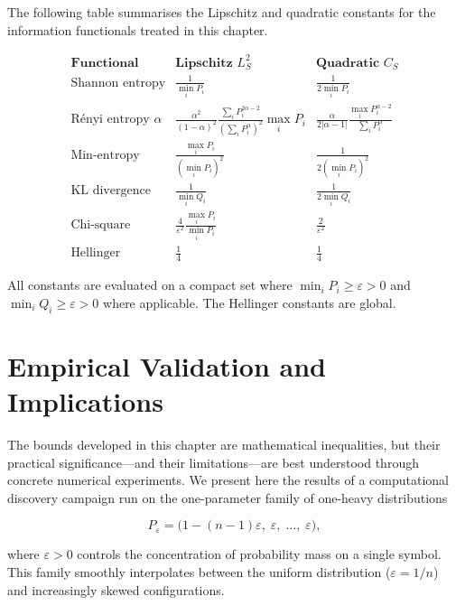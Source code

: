 The following table summarises the Lipschitz and quadratic constants
for the information functionals treated in this chapter.

\[
\begin{array}{lll}
\textbf{Functional} & \textbf{Lipschitz } L_S^2 & \textbf{Quadratic } C_S \\ \hline
\text{Shannon entropy} & \displaystyle\frac{1}{\min_i P_i} & \displaystyle\frac{1}{2\min_i P_i} \\[8pt]
\text{R\'enyi entropy } \alpha & \displaystyle\frac{\alpha^2}{(1-\alpha)^2}\frac{\sum_i P_i^{2\alpha-2}}{(\sum_i P_i^{\alpha})^2}\max_i P_i & \displaystyle\frac{\alpha}{2|\alpha-1|}\frac{\max_i P_i^{\alpha-2}}{\sum_i P_i^{\alpha}} \\[8pt]
\text{Min-entropy} & \displaystyle\frac{\max_i P_i}{(\min_i P_i)^2} & \displaystyle\frac{1}{2(\min_i P_i)^2} \\[8pt]
\text{KL divergence} & \displaystyle\frac{1}{\min_i Q_i} & \displaystyle\frac{1}{2\min_i Q_i} \\[8pt]
\text{Chi-square} & \displaystyle\frac{4}{\varepsilon^2}\frac{\max_i P_i}{\min_i P_i} & \displaystyle\frac{2}{\varepsilon^2} \\[8pt]
\text{Hellinger} & \displaystyle\frac14 & \displaystyle\frac14
\end{array}
\]

All constants are evaluated on a compact set where
\(\min_i P_i\ge\varepsilon>0\) and \(\min_i Q_i\ge\varepsilon>0\) where
applicable.  The Hellinger constants are global.

\section{Empirical Validation and Implications}\label{ch:sec:empirical-validation-and-implications}

The bounds developed in this chapter are mathematical inequalities,
but their practical significance---and their limitations---are best
understood through concrete numerical experiments.  We present here
the results of a computational discovery campaign run on the
one-parameter family of one-heavy distributions

\[
P_\varepsilon = \bigl(1-(n-1)\varepsilon,\; \varepsilon,\; \ldots,\; \varepsilon\bigr),
\]

where $\varepsilon>0$ controls the concentration of probability mass on a single symbol.
This family smoothly interpolates between the uniform distribution
($\varepsilon=1/n$) and increasingly skewed configurations.

